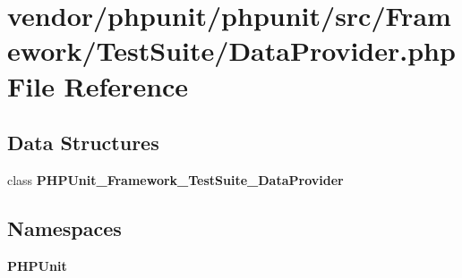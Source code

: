 \section{vendor/phpunit/phpunit/src/\+Framework/\+Test\+Suite/\+Data\+Provider.php File Reference}
\label{_data_provider_8php}
\subsection*{Data Structures}
\begin{DoxyCompactItemize}
\item 
class {\bf P\+H\+P\+Unit\+\_\+\+Framework\+\_\+\+Test\+Suite\+\_\+\+Data\+Provider}
\end{DoxyCompactItemize}
\subsection*{Namespaces}
\begin{DoxyCompactItemize}
\item 
 {\bf P\+H\+P\+Unit}
\end{DoxyCompactItemize}
